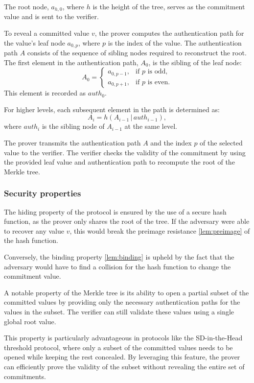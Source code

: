 \documentclass[twoside,11pt,openright]{report}
\theoremstyle{definition}
\theoremstyle{plain}
\begin{document}
The root node, $a_{h,0}$, where $h$ is the height of the tree, serves as the commitment value and is sent to the verifier.

To reveal a committed value $v$, the prover computes the authentication path for the value's leaf node $a_{0,p}$, where $p$ is the index of the value. The authentication path $A$ consists of the sequence of sibling nodes required to reconstruct the root. The first element in the authentication path, $A_0$, is the sibling of the leaf node:
\[
  A_0 =
  \begin{cases}
    a_{0,p-1}, & \text{if } p \text{ is odd,}  \\
    a_{0,p+1}, & \text{if } p \text{ is even.}
  \end{cases}
\]
This element is recorded as $auth_0$.

For higher levels, each subsequent element in the path is determined as:
\[
  A_i = h(A_{i-1} \, | \, auth_{i-1}),
\]
where $auth_i$ is the sibling node of $A_{i-1}$ at the same level.

The prover transmits the authentication path $A$ and the index $p$ of the selected value to the verifier. The verifier checks the validity of the commitment by using the provided leaf value and authentication path to recompute the root of the Merkle tree.

\subsubsection{Security properties}

The hiding property of the protocol is ensured by the use of a secure hash function, as the prover only shares the root of the tree. If the adversary were able to recover any value $v$, this would break the preimage resistance \autoref{lem:preimage} of the hash function.

Conversely, the binding property \autoref{lem:binding} is upheld by the fact that the adversary would have to find a collision for the hash function to change the commitment value.

A notable property of the Merkle tree is its ability to open a partial subset of the committed values by providing only the necessary authentication paths for the values in the subset. The verifier can still validate these values using a single global root value.

This property is particularly advantageous in protocols like the SD-in-the-Head threshold protocol, where only a subset of the committed values needs to be opened while keeping the rest concealed. By leveraging this feature, the prover can efficiently prove the validity of the subset without revealing the entire set of commitments.
\end{document}
